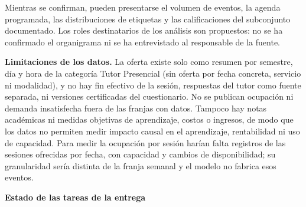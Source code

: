 \documentclass[11pt,letterpaper]{article}
\begin{document}
Mientras se confirman, pueden presentarse el volumen de eventos, la agenda programada, las distribuciones de etiquetas y las calificaciones del subconjunto documentado. Los roles destinatarios de los análisis son propuestos: no se ha confirmado el organigrama ni se ha entrevistado al responsable de la fuente.

\textbf{Limitaciones de los datos.} La oferta existe solo como resumen por semestre, día y hora de la categoría Tutor Presencial (sin oferta por fecha concreta, servicio ni modalidad), y no hay fin efectivo de la sesión, respuestas del tutor como fuente separada, ni versiones certificadas del cuestionario. No se publican ocupación ni demanda insatisfecha fuera de las franjas con datos. Tampoco hay notas académicas ni medidas objetivas de aprendizaje, costos o ingresos, de modo que los datos no permiten medir impacto causal en el aprendizaje, rentabilidad ni uso de capacidad. Para medir la ocupación por sesión harían falta registros de las sesiones ofrecidas por fecha, con capacidad y cambios de disponibilidad; su granularidad sería distinta de la franja semanal y el modelo no fabrica esos eventos.

\textbf{Estado de las tareas de la entrega}
\end{document}
